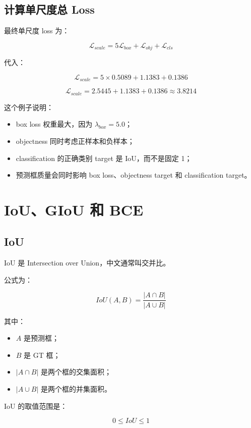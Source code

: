 \documentclass[UTF8,12pt]{ctexart}
\begin{document}
\subsection{计算单尺度总 Loss}

最终单尺度 loss 为：

\[
\mathcal{L}_{scale}
=5\mathcal{L}_{box}
+\mathcal{L}_{obj}
+\mathcal{L}_{cls}
\]

代入：

\[
\mathcal{L}_{scale}
=5 \times 0.5089
+1.1383
+0.1386
\]

\[
\mathcal{L}_{scale}
=2.5445+1.1383+0.1386
\approx 3.8214
\]

这个例子说明：

\begin{itemize}[leftmargin=2em]
    \item box loss 权重最大，因为 $\lambda_{box}=5.0$；
    \item objectness 同时考虑正样本和负样本；
    \item classification 的正确类别 target 是 IoU，而不是固定 1；
    \item 预测框质量会同时影响 box loss、objectness target 和 classification target。
\end{itemize}

\section{IoU、GIoU 和 BCE}

\subsection{IoU}

IoU 是 Intersection over Union，中文通常叫交并比。

公式为：

\[
IoU(A,B)=\frac{|A \cap B|}{|A \cup B|}
\]

其中：

\begin{itemize}[leftmargin=2em]
    \item $A$ 是预测框；
    \item $B$ 是 GT 框；
    \item $|A \cap B|$ 是两个框的交集面积；
    \item $|A \cup B|$ 是两个框的并集面积。
\end{itemize}

IoU 的取值范围是：

\[
0 \leq IoU \leq 1
\]
\end{document}
